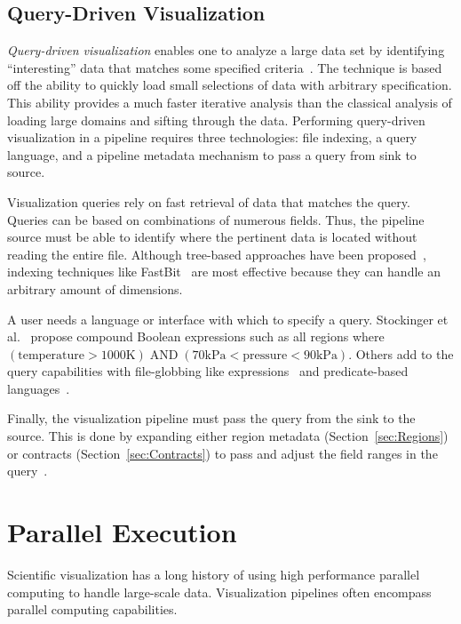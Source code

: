 \documentclass[journal,twocolumn,10pt,letterpaper,twoside]{IEEEtran}
\newcommand*{\lcite}[1]{~\cite{#1}}
\newcommand*{\scite}[1]{~\cite{#1}}
\newcommand*{\keyterm}[1]{\emph{#1}}
\newcommand{\etal}{et al.}
\begin{document}
\subsection{Query-Driven Visualization}
\label{sec:QueryDrivenVisualization}

\keyterm{Query-driven visualization} enables one to analyze a large data
set by identifying ``interesting'' data that matches some specified
criteria\lcite{Stockinger2005,Gosink2008}.  The technique is based off the
ability to quickly load small selections of data with arbitrary
specification.  This ability provides a much faster iterative analysis than
the classical analysis of loading large domains and sifting through the
data.  Performing query-driven visualization in a pipeline requires three
technologies: file indexing, a query language, and a pipeline metadata
mechanism to pass a query from sink to source.

Visualization queries rely on fast retrieval of data that matches the
query.  Queries can be based on combinations of numerous fields.  Thus, the
pipeline source must be able to identify where the pertinent data is
located without reading the entire file.  Although tree-based approaches
have been proposed\lcite{Chiang1998}, indexing techniques like
FastBit\lcite{FastBit,Wu2010} are most effective because they can handle an
arbitrary amount of dimensions.

A user needs a language or interface with which to specify a query.
Stockinger \etal\scite{Stockinger2005} propose compound Boolean expressions
such as all regions where $(\mathrm{temperature} > 1000\mathrm{K}) \;
\mathrm{AND} \; (70\mathrm{kPa} < \mathrm{pressure} < 90\mathrm{kPa})$.
Others add to the query capabilities with file-globbing like
expressions\lcite{Glatter2008} and predicate-based
languages\lcite{Johnson2009}.

Finally, the visualization pipeline must pass the query from the sink to
the source.  This is done by expanding either region metadata
(Section~\ref{sec:Regions}) or contracts (Section~\ref{sec:Contracts}) to
pass and adjust the field ranges in the query\lcite{Rubel2008}.


\section{Parallel Execution}
\label{sec:ParallelExecution}

Scientific visualization has a long history of using high performance
parallel computing to handle large-scale data.  Visualization pipelines
often encompass parallel computing capabilities.
\end{document}
